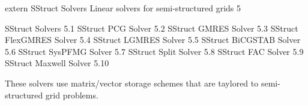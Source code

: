 \documentclass{article}
\begin{document}
\begin{cxxentry}
{extern }
        {SStruct Solvers}
        {}
        {Linear solvers for semi-structured grids}
        {5}
\begin{cxxnames}
\cxxitem{}
        {SStruct Solvers}
        {}
        {
}
        {5.1}
\cxxitem{}
        {SStruct PCG Solver}
        {}
        {
}
        {5.2}
\cxxitem{}
        {SStruct GMRES Solver}
        {}
        {
}
        {5.3}
\cxxitem{}
        {SStruct FlexGMRES Solver}
        {}
        {
}
        {5.4}
\cxxitem{}
        {SStruct LGMRES Solver}
        {}
        {
}
        {5.5}
\cxxitem{}
        {SStruct BiCGSTAB Solver}
        {}
        {
}
        {5.6}
\cxxitem{}
        {SStruct SysPFMG Solver}
        {}
        {
}
        {5.7}
\cxxitem{}
        {SStruct Split Solver}
        {}
        {
}
        {5.8}
\cxxitem{}
        {SStruct FAC Solver}
        {}
        {
}
        {5.9}
\cxxitem{}
        {SStruct Maxwell Solver}
        {}
        {
}
        {5.10}
\end{cxxnames}
\begin{cxxdoc}


These solvers use matrix/vector storage schemes that are taylored
to semi-structured grid problems.



\end{cxxdoc}
\end{cxxentry}
\end{document}
